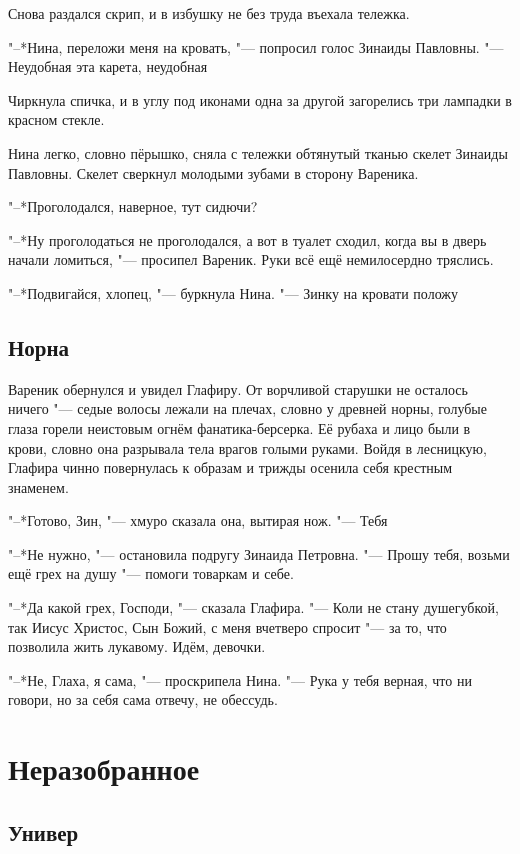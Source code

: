 Снова раздался скрип, и в избушку не без труда въехала тележка.

"--*Нина, переложи меня на кровать, "--- попросил голос Зинаиды Павловны.
"--- Неудобная эта карета, неудобная\ldotst

Чиркнула спичка, и в углу под иконами одна за другой загорелись три лампадки в красном стекле.

Нина легко, словно пёрышко, сняла с тележки обтянутый тканью скелет Зинаиды Павловны.
Скелет сверкнул молодыми зубами в сторону Вареника.

"--*Проголодался, наверное, тут сидючи?

"--*Ну проголодаться не проголодался, а вот в туалет сходил, когда вы в дверь начали ломиться, "--- просипел Вареник.
Руки всё ещё немилосердно тряслись.

"--*Подвигайся, хлопец, "--- буркнула Нина.
"--- Зинку на кровати положу\ldotst

\section{Норна}

Вареник обернулся и увидел Глафиру.
От ворчливой старушки не осталось ничего "--- седые волосы лежали на плечах, словно у древней норны, голубые глаза горели неистовым огнём фанатика-берсерка.
Её рубаха и лицо были в крови, словно она разрывала тела врагов голыми руками.
Войдя в лесницкую, Глафира чинно повернулась к образам и трижды осенила себя крестным знаменем.

"--*Готово, Зин, "--- хмуро сказала она, вытирая нож.
"--- Тебя\ldotsq

"--*Не нужно, "--- остановила подругу Зинаида Петровна.
"--- Прошу тебя, возьми ещё грех на душу "--- помоги товаркам и себе.

"--*Да какой грех, Господи, "--- сказала Глафира.
"--- Коли не стану душегубкой, так Иисус Христос, Сын Божий, с меня вчетверо спросит "--- за то, что позволила жить лукавому.
Идём, девочки.

"--*Не, Глаха, я сама, "--- проскрипела Нина.
"--- Рука у тебя верная, что ни говори, но за себя сама отвечу, не обессудь.

\chapter{Неразобранное}

\section{Универ}

